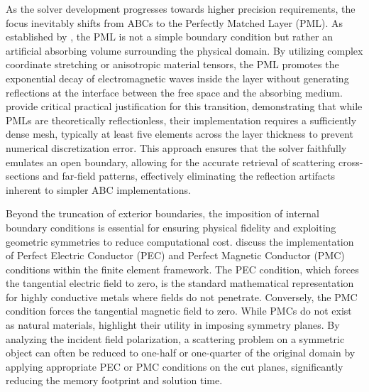 \documentclass[class=report, crop=false]{standalone}
\begin{document}
\vspace{12pt}

As the solver development progresses towards higher precision requirements, the focus inevitably shifts from ABCs to the Perfectly Matched Layer (PML). As established by \citet{Berenger1994}, the PML is not a simple boundary condition but rather an artificial absorbing volume surrounding the physical domain. By utilizing complex coordinate stretching or anisotropic material tensors, the PML promotes the exponential decay of electromagnetic waves inside the layer without generating reflections at the interface between the free space and the absorbing medium. \citet{Grand2020-we} provide critical practical justification for this transition, demonstrating that while PMLs are theoretically reflectionless, their implementation requires a sufficiently dense mesh, typically at least five elements across the layer thickness to prevent numerical discretization error. This approach ensures that the solver faithfully emulates an open boundary, allowing for the accurate retrieval of scattering cross-sections and far-field patterns, effectively eliminating the reflection artifacts inherent to simpler ABC implementations.

\vspace{12pt}

Beyond the truncation of exterior boundaries, the imposition of internal boundary conditions is essential for ensuring physical fidelity and exploiting geometric symmetries to reduce computational cost. \citet{Chaber2017} discuss the implementation of Perfect Electric Conductor (PEC) and Perfect Magnetic Conductor (PMC) conditions within the finite element framework. The PEC condition, which forces the tangential electric field to zero, is the standard mathematical representation for highly conductive metals where fields do not penetrate. Conversely, the PMC condition forces the tangential magnetic field to zero. While PMCs do not exist as natural materials, \citet{Chaber2017} highlight their utility in imposing symmetry planes. By analyzing the incident field polarization, a scattering problem on a symmetric object can often be reduced to one-half or one-quarter of the original domain by applying appropriate PEC or PMC conditions on the cut planes, significantly reducing the memory footprint and solution time.

\vspace{12pt}
\end{document}
